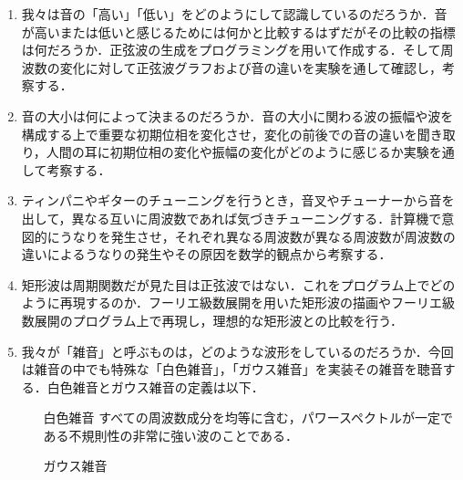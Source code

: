 \begin{enumerate}
	\item 我々は音の「高い」「低い」をどのようにして認識しているのだろうか．音が高いまたは低いと感じるためには何かと比較するはずだがその比較の指標は何だろうか．正弦波の生成をプログラミングを用いて作成する．そして周波数の変化に対して正弦波グラフおよび音の違いを実験を通して確認し，考察する．
	\item 音の大小は何によって決まるのだろうか．音の大小に関わる波の振幅や波を構成する上で重要な初期位相を変化させ，変化の前後での音の違いを聞き取り，人間の耳に初期位相の変化や振幅の変化がどのように感じるか実験を通して考察する．
	\item ティンパニやギターのチューニングを行うとき，音叉やチューナーから音を出して，異なる互いに周波数であれば気づきチューニングする．計算機で意図的にうなりを発生させ，それぞれ異なる周波数が異なる周波数が周波数の違いによるうなりの発生やその原因を数学的観点から考察する．
	\item 矩形波は周期関数だが見た目は正弦波ではない．これをプログラム上でどのように再現するのか．フーリエ級数展開を用いた矩形波の描画やフーリエ級数展開のプログラム上で再現し，理想的な矩形波との比較を行う．
	\item 我々が「雑音」と呼ぶものは，どのような波形をしているのだろうか．今回は雑音の中でも特殊な「白色雑音」，「ガウス雑音」を実装その雑音を聴音する．白色雑音とガウス雑音の定義は以下．
	\begin{itemize}
		\item[白色雑音] すべての周波数成分を均等に含む，パワースペクトルが一定である不規則性の非常に強い波のことである．\cite{whitenoise}
		\item[ガウス雑音] 
	\end{itemize}
\end{enumerate}